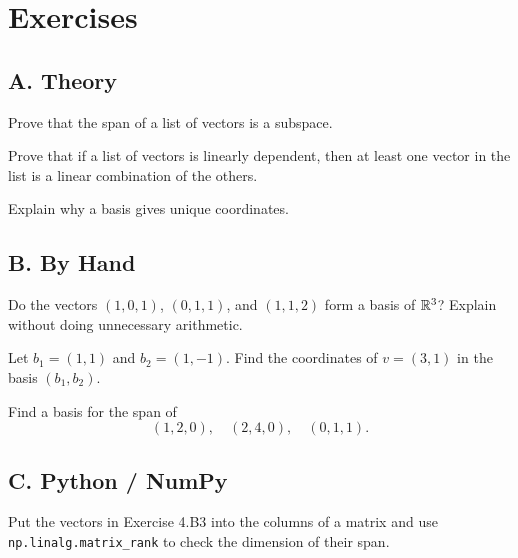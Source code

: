 \section*{Exercises}

\subsection*{A. Theory}

\begin{exercise}
Prove that the span of a list of vectors is a subspace.
\end{exercise}

\begin{exercise}
Prove that if a list of vectors is linearly dependent, then at least one vector
in the list is a linear combination of the others.
\end{exercise}

\begin{exercise}
Explain why a basis gives unique coordinates.
\end{exercise}

\subsection*{B. By Hand}

\begin{exercise}
Do the vectors $(1,0,1)$, $(0,1,1)$, and $(1,1,2)$ form a basis of $\mathbb{R}^3$?
Explain without doing unnecessary arithmetic.
\end{exercise}

\begin{exercise}
Let $b_1=(1,1)$ and $b_2=(1,-1)$. Find the coordinates of $v=(3,1)$ in the
basis $(b_1,b_2)$.
\end{exercise}

\begin{exercise}
Find a basis for the span of
\[
  (1,2,0),\quad (2,4,0),\quad (0,1,1).
\]
\end{exercise}

\subsection*{C. Python / NumPy}

\begin{exercise}
Put the vectors in Exercise 4.B3 into the columns of a matrix and use
\texttt{np.linalg.matrix\_rank} to check the dimension of their span.
\end{exercise}

